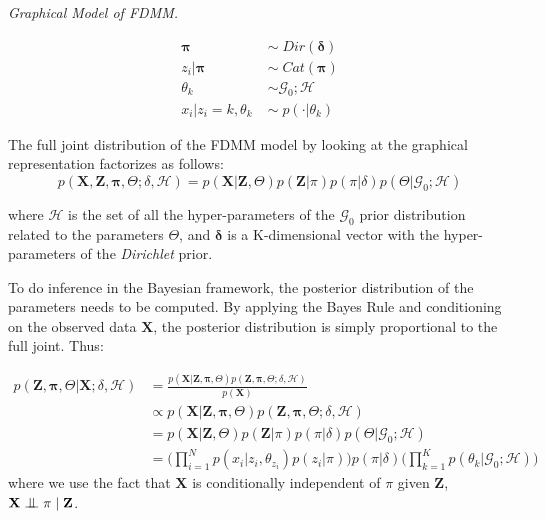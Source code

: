 \begin{minipage}{0.6\textwidth}%
  \hfill
  \begin{center}
	
	\emph{Graphical Model of FDMM.}
  \end{center}
\end{minipage}
\begin{minipage}{0.1\textwidth}%
  \begin{equation*}
  	\begin{aligned}
  		\mathbf{\pi} \; & \sim \; Dir(\mathbf{\delta}) \\
  		z_{i}|\mathbf{\pi} \; & \sim \; Cat(\mathbf{\pi}) \\
  		\theta_{k} \; & \sim \mathcal{G}_{0}; \mathcal{H} \\
  		x_{i}|z_{i}=k,\theta_{k} \; & \sim \; p(\cdot | \theta_{k})  
  	\end{aligned} 
  \end{equation*} 
\end{minipage}

\vspace*{5mm}
The full joint distribution of the FDMM model by looking at the graphical representation factorizes as follows:
\begin{equation}%
	p(\mathbf{X},\mathbf{Z},\mathbf{\pi},\Theta;\delta,\mathcal{H}) = p(\mathbf{X}|\mathbf{Z},\Theta) p(\mathbf{Z}|\pi) p(\pi|\delta) p(\Theta |\mathcal{G}_{0}; \mathcal{H})
\end{equation}

where $\mathcal{H}$ is the set of all the hyper-parameters of the $\mathcal{G}_{0}$ prior distribution related to the parameters $\Theta$, and $\mathbf{\delta}$ is a K-dimensional vector with the hyper-parameters of the \emph{Dirichlet} prior. 

To do inference in the Bayesian framework, the posterior distribution of the parameters needs to be computed. By applying the Bayes Rule and conditioning on the observed data $\mathbf{X}$, the posterior distribution is simply proportional to the full joint. Thus:
 
\begin{equation}%
  \begin{aligned}
	p(\mathbf{Z},\mathbf{\pi},\Theta|\mathbf{X} ;\delta,\mathcal{H}) & = \frac{p(\mathbf{X}|\mathbf{Z},\mathbf{\pi},\Theta) p(\mathbf{Z},\mathbf{\pi},\Theta ;\delta,\mathcal{H})}{p(\mathbf{X})} \\
	   & \propto p(\mathbf{X}|\mathbf{Z},\mathbf{\pi},\Theta) p(\mathbf{Z},\mathbf{\pi},\Theta ;\delta,\mathcal{H}) \\
	   & = p(\mathbf{X}|\mathbf{Z},\Theta) p(\mathbf{Z}|\pi) p(\pi|\delta) p(\Theta |\mathcal{G}_{0}; \mathcal{H}) \\
	   & = \bigg(\prod\limits_{i=1}^{N} p(x_{i}|z_{i},\theta_{z_{i}}) p(z_{i}|\pi)\bigg) p(\pi|\delta) \bigg(\prod\limits_{k=1}^{K} p(\theta_{k} |\mathcal{G}_{0}; \mathcal{H})\bigg)
  \end{aligned}
\end{equation}
where we use the fact that $\mathbf{X}$ is conditionally independent of $\pi$ given $\mathbf{Z}$, \ie $\mathbf{X} \bigCI \pi \;| \; \mathbf{Z} $. 

